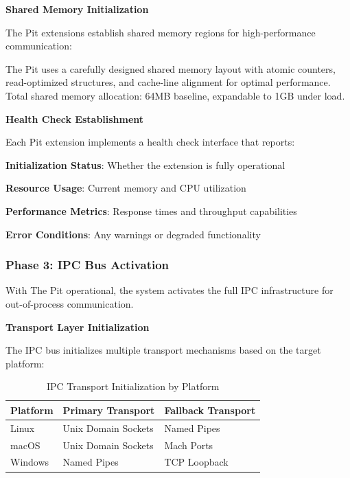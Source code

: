 \textbf{Shared Memory Initialization}

The Pit extensions establish shared memory regions for high-performance communication:

\begin{infobox}[title=Shared Memory Layout]
The Pit uses a carefully designed shared memory layout with atomic counters, read-optimized structures, and cache-line alignment for optimal performance. Total shared memory allocation: 64MB baseline, expandable to 1GB under load.
\end{infobox}

\textbf{Health Check Establishment}

Each Pit extension implements a health check interface that reports:
\begin{compactlist}
    \item \textbf{Initialization Status}: Whether the extension is fully operational
    \item \textbf{Resource Usage}: Current memory and CPU utilization
    \item \textbf{Performance Metrics}: Response times and throughput capabilities
    \item \textbf{Error Conditions}: Any warnings or degraded functionality
\end{compactlist}

\subsubsection{Phase 3: IPC Bus Activation}

With The Pit operational, the system activates the full IPC infrastructure for out-of-process communication.

\textbf{Transport Layer Initialization}

The IPC bus initializes multiple transport mechanisms based on the target platform:

\begin{table}[h]
\centering
\caption{IPC Transport Initialization by Platform}
\label{tab:ipc-transport-init}
\begin{tabular}{@{}lll@{}}
\toprule
\textbf{Platform} & \textbf{Primary Transport} & \textbf{Fallback Transport} \\
\midrule
Linux & Unix Domain Sockets & Named Pipes \\
macOS & Unix Domain Sockets & Mach Ports \\
Windows & Named Pipes & TCP Loopback \\
\bottomrule
\end{tabular}
\end{table}

